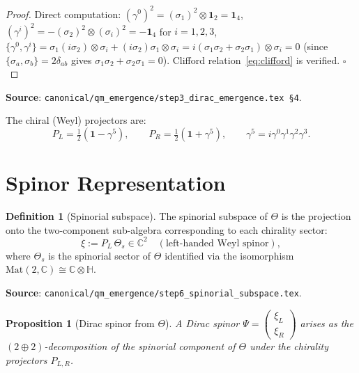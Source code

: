 \documentclass[11pt,a4paper]{article}
\newtheorem{proposition}[theorem]{Proposition}
\theoremstyle{definition}
\newtheorem{definition}[theorem]{Definition}
\theoremstyle{remark}
\begin{document}
\begin{proof}
Direct computation: $(\gamma^0)^2 = (\sigma_1)^2 \otimes \mathbf{1}_2 = \mathbf{1}_4$,
$(\gamma^i)^2 = -(\sigma_2)^2 \otimes (\sigma_i)^2 = -\mathbf{1}_4$ for $i=1,2,3$,
$\{\gamma^0,\gamma^i\} = \sigma_1(i\sigma_2)\otimes\sigma_i + (i\sigma_2)\sigma_1\otimes\sigma_i
= i(\sigma_1\sigma_2+\sigma_2\sigma_1)\otimes\sigma_i = 0$
(since $\{\sigma_a,\sigma_b\}=2\delta_{ab}$ gives $\sigma_1\sigma_2+\sigma_2\sigma_1=0$).
Clifford relation~\eqref{eq:clifford} is verified. $\square$
\end{proof}

\noindent\textbf{Source}: \texttt{canonical/qm\_emergence/step3\_dirac\_emergence.tex \S4}.

The chiral (Weyl) projectors are:
\begin{equation}
  P_L = \tfrac12(\mathbf{1}-\gamma^5), \qquad
  P_R = \tfrac12(\mathbf{1}+\gamma^5), \qquad
  \gamma^5 = i\gamma^0\gamma^1\gamma^2\gamma^3.
\end{equation}

\section{Spinor Representation}\label{sec:spinor}

\begin{definition}[Spinorial subspace]
The spinorial subspace of $\Theta$ is the projection onto the two-component
sub-algebra corresponding to each chirality sector:
\begin{equation}
  \xi := P_L\,\Theta_s \in \mathbb{C}^2
  \quad (\text{left-handed Weyl spinor}),
\end{equation}
where $\Theta_s$ is the spinorial sector of $\Theta$ identified via the
isomorphism $\mathrm{Mat}(2,\mathbb{C}) \cong \mathbb{C}\otimes\mathbb{H}$.
\end{definition}

\noindent\textbf{Source}: \texttt{canonical/qm\_emergence/step6\_spinorial\_subspace.tex}.

\begin{proposition}[Dirac spinor from $\Theta$]\label{prop:dirac_spinor}
A Dirac spinor $\Psi = \begin{pmatrix}\xi_L \\ \xi_R\end{pmatrix}$
arises as the $(2\oplus 2)$-decomposition of the spinorial component of $\Theta$
under the chirality projectors $P_{L,R}$.
\end{proposition}
\end{document}
